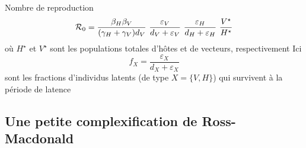 \documentclass[aspectratio=169]{beamer}\usepackage[]{graphicx}\usepackage[]{xcolor}
\begin{document}
\begin{frame}{Nombre de reproduction}
\begin{equation}\label{eq:vector_host_2}
\mathcal{R}_0 =
\frac{\beta_H\beta_V}{(\gamma_H+\gamma_V)d_V}\
\frac{\varepsilon_V}{d_V+\varepsilon_V}\
\frac{\varepsilon_H}{d_H+\varepsilon_H}\
\frac{V^\star}{H^\star}
\end{equation}
où $H^\star$ et $V^\star$ sont les populations totales d'hôtes et de vecteurs, respectivement
\vfill
Ici
\[
f_X = \frac{\varepsilon_X}{d_X+\varepsilon_X}
\]
sont les fractions d'individus latents (de type $X=\{V,H\}$) qui survivent à la période de latence
\end{frame}


\subsection{Une petite complexification de Ross-Macdonald}
\end{document}
